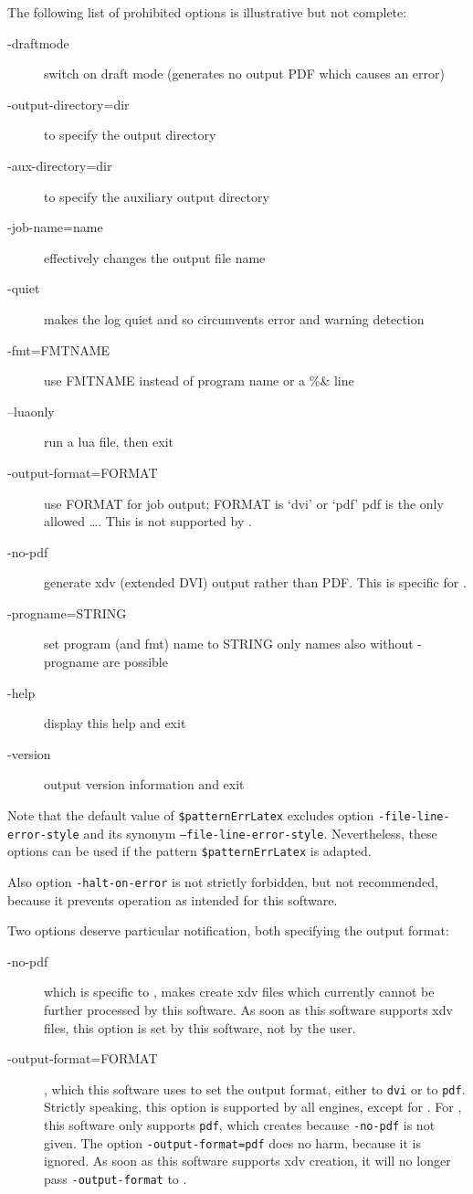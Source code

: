 The following list of prohibited options is illustrative but not complete: 
%
\begin{description}
  \item[{-draftmode}] switch on draft mode (generates no output PDF which causes an error) 
  \item[{-output-directory=dir}] to specify the output directory 
  \item[{-aux-directory=dir}] to specify the auxiliary output directory 
  \item[{-job-name=name}] effectively changes the output file name 
  \item[{-quiet}] makes the log quiet and 
      so circumvents error and warning detection 
  \item[{-fmt=FMTNAME}] use FMTNAME instead of program name or a \%\& line 
  \item[{--luaonly}] run a lua file, then exit 
  \item[{-output-format=FORMAT}] use FORMAT for job output; FORMAT is `dvi' or `pdf'
                   pdf is the only allowed \dots. 
                   This is not supported by \xelatex. 
  \item[{-no-pdf}] generate \gls{xdv} (extended DVI) output rather than PDF\@. 
   This is specific for \xelatex. 
  \item[{-progname=STRING}] set program (and fmt) name to STRING
    only names also without -progname are possible 
  \item[{-help}] display this help and exit
  \item[{-version}] output version information and exit
\end{description}

Note that the default value of \texttt{\$patternErrLatex} 
excludes option \texttt{-file-line-error-style} 
and its synonym \texttt{--file-line-error-style}. 
Nevertheless, these options can be used 
if the pattern \texttt{\$patternErrLatex} is adapted. 

Also option \texttt{-halt-on-error} is not strictly forbidden, but not recommended, 
because it prevents operation as intended for this software. 


Two options deserve particular notification, both specifying the output format: 
%
\begin{description}
  \item[{-no-pdf}] which is specific to \xelatex, makes \xelatex{} create \gls{xdv} files 
  which currently cannot be further processed by this software. 
  As soon as this software supports \gls{xdv} files, this option is set by this software, 
  not by the user. 
  \item[{-output-format=FORMAT}], which this software uses to set the output format, 
  either to \texttt{dvi} or to \texttt{pdf}. 
  Strictly speaking, this option is supported by all engines, except for \xelatex. 
  For \xelatex, this software only supports \texttt{pdf}, 
  which \xelatex{} creates because \texttt{-no-pdf} is not given. 
  The option \texttt{-output-format=pdf} does no harm, because it is ignored. 
  As soon as this software supports \gls{xdv} creation, 
  it will no longer pass \texttt{-output-format} to \xelatex. 
\end{description}


